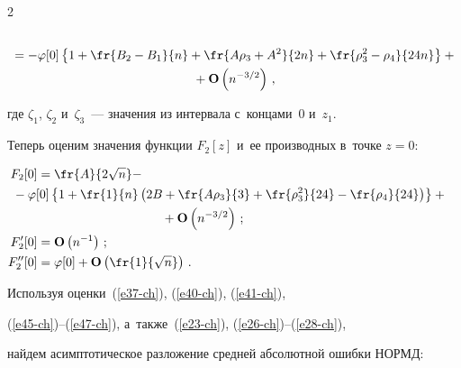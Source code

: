 \begin{multicols}{2}
\begin{multline}
\\


 {}=-\varphi[0]\left\{ 1+\fr{B_2-B_1}{n}+\fr{A\rho_3+A^2}{2n}


 +\fr{\rho_3^2-\rho_4  }{24n} \right\}+{}\\


{} +\mathbf{O}\left(n^{-3/2}\right)\,,


 \label{e47-ch}


 \end{multline}


 где $\zeta_1$, $\zeta_2$ и~$\zeta_3$~--- значения из интервала с~концами~$0$ и~$z_1$.





 Теперь оценим значения функции $F_2[z]$ и~ее производных в~точке $z=0$:


 \begin{align}


 F_2[0]&=


 \fr{A}{2\sqrt{n}} -&{}\notag\\


 &\hspace*{-7mm}{}-\varphi[0]\left\{ 1+\fr{1}{n}


 \left(2B+\fr{A\rho_3 }{3} +\fr{\rho_3^2}{24}


 -\fr{\rho_4}{24}\right)\right\}+{}\notag\\


& \hspace*{35mm}{}+\mathbf{O}\left(n^{-3/2}\right)\,;


 \label{e48-ch}\\


 F'_2[0]&=\mathbf{O}\left(n^{-1}\right)\,;


 \label{e49-ch}\\


 F''_2[0]&= \varphi[0]+\mathbf{O}\left(\fr{1}{\sqrt{n}}\right)\,.


  \label{e50-ch}


 \end{align}





 Используя оценки~(\ref{e37-ch}), (\ref{e40-ch}), (\ref{e41-ch}), 


 (\ref{e45-ch})--(\ref{e47-ch}), а~также~(\ref{e23-ch}), (\ref{e26-ch})--(\ref{e28-ch}),


 найдем асимптотическое разложение средней абсолютной ошибки НОРМД:



\end{multicols}
